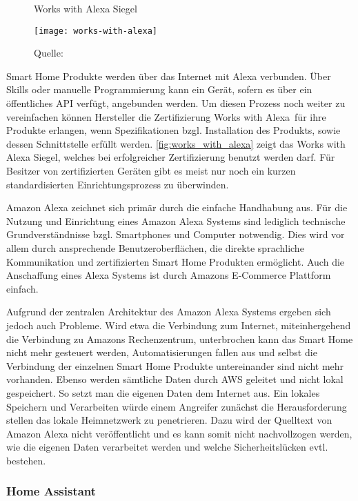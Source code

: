 \begin{wrapfigure}{r}{0.35\textwidth}
	\centering
	\caption{Works with Alexa Siegel}
	\texttt{[image: works-with-alexa]}
	\caption*{\footnotesize{Quelle: }}
	\label{fig:works_with_alexa}
\end{wrapfigure}

Smart Home Produkte werden über das Internet mit Alexa verbunden.
Über Skills oder manuelle Programmierung kann ein Gerät, sofern es über ein öffentliches \ac{API} verfügt, angebunden werden.
Um diesen Prozess noch weiter zu vereinfachen können Hersteller die Zertifizierung \glqq Works with Alexa\grqq \ für ihre Produkte erlangen, wenn Spezifikationen bzgl. Installation des Produkts, sowie dessen Schnittstelle erfüllt werden.
\autoref{fig:works_with_alexa} zeigt das Works with Alexa Siegel, welches bei erfolgreicher Zertifizierung benutzt werden darf.
Für Besitzer von zertifizierten Geräten gibt es meist nur noch ein kurzen standardisierten Einrichtungsprozess zu überwinden.

Amazon Alexa zeichnet sich primär durch die einfache Handhabung aus.
Für die Nutzung und Einrichtung eines Amazon Alexa Systems sind lediglich technische Grundverständnisse bzgl. Smartphones und Computer notwendig.
Dies wird vor allem durch ansprechende Benutzeroberflächen, die direkte sprachliche Kommunikation und zertifizierten Smart Home Produkten ermöglicht.
Auch die Anschaffung eines Alexa Systems ist durch Amazons E-Commerce Plattform einfach.

Aufgrund der zentralen Architektur des Amazon Alexa Systems ergeben sich jedoch auch Probleme.
Wird etwa die Verbindung zum Internet, miteinhergehend die Verbindung zu Amazons Rechenzentrum, unterbrochen kann das Smart Home nicht mehr gesteuert werden, Automatisierungen fallen aus und selbst die Verbindung der einzelnen Smart Home Produkte untereinander sind nicht mehr vorhanden.
Ebenso werden sämtliche Daten durch \ac{AWS} geleitet und nicht lokal gespeichert.
So setzt man die eigenen Daten dem Internet aus.
Ein lokales Speichern und Verarbeiten würde einem Angreifer zunächst die Herausforderung stellen das lokale Heimnetzwerk zu penetrieren.
Dazu wird der Quelltext von Amazon Alexa nicht veröffentlicht und es kann somit nicht nachvollzogen werden, wie die eigenen Daten verarbeitet werden und welche Sicherheitslücken evtl. bestehen.

\subsubsection{Home Assistant}

